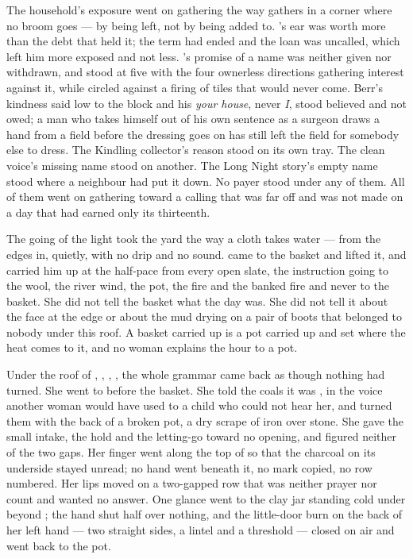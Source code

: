The household's exposure went on gathering the way  gathers in a corner where no broom goes --- by being left, not by being added to. 's ear was worth more than the debt that held it; the term had ended and the loan was uncalled, which left him more exposed and not less. 's promise of a name was neither given nor withdrawn, and  stood at five with the four ownerless directions gathering interest against it, while  circled against a firing of tiles that would never come. Berr's kindness said low to the block and his \emph{your house}, never \emph{I}, stood believed and not owed; a man who takes himself out of his own sentence as a surgeon draws a hand from a field before the dressing goes on has still left the field for somebody else to dress. The Kindling collector's reason stood on its own tray. The clean voice's missing name stood on another. The Long Night story's empty name stood where a neighbour had put it down. No payer stood under any of them. All of them went on gathering toward a calling that was far off and was not made on a day that had earned only its thirteenth.

\scenebreak

The going of the light took the yard the way a cloth takes water --- from the edges in, quietly, with no drip and no sound.  came to the basket and lifted it, and carried him up  at the half-pace from every open slate, the instruction going to the wool, the river wind, the pot, the fire and the banked fire and never to the basket. She did not tell the basket what the day was. She did not tell it about the face at the edge or about the mud drying on a pair of boots that belonged to nobody under this roof. A basket carried up is a pot carried up and set where the heat comes to it, and no woman explains the hour to a pot.

Under the roof of , , , , the whole grammar came back as though nothing had turned. She went to  before the basket. She told the coals it was , in the voice another woman would have used to a child who could not hear her, and turned them with the back of a broken pot, a dry scrape of iron over stone. She gave the small intake, the hold and the letting-go toward no opening, and figured neither of the two gaps. Her finger went along the top of  so that the charcoal on its underside stayed unread; no hand went beneath it, no mark copied, no row numbered. Her lips moved on a two-gapped row that was neither prayer nor count and wanted no answer. One glance went to the clay jar standing cold under  beyond ; the hand shut half over nothing, and the little-door burn on the back of her left hand --- two straight sides, a lintel and a threshold --- closed on air and went back to the pot.

